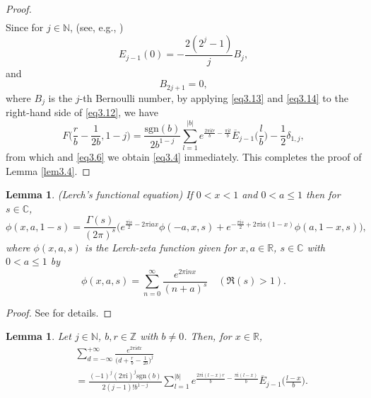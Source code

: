\documentclass[reqno]{amsart}
\numberwithin{equation}{section}
\newtheorem{lemma}[thm]{Lemma}
\begin{document}
\begin{proof}
\begin{eqnarray}
\end{eqnarray}
Since for $j\in\mathbb{N}$, (see, e.g., \cite[p. 805]{abramowitz})
\begin{equation}\label{eq3.13}
E_{j-1}(0)=-\frac{2(2^{j}-1)}{j}B_{j},
\end{equation}
and
\begin{equation}\label{eq3.14}
B_{2j+1}=0,
\end{equation}
where $B_{j}$ is the $j$-th Bernoulli number, by applying \eqref{eq3.13} and \eqref{eq3.14} to the right-hand side of \eqref{eq3.12}, we have
\begin{equation*}
F\biggl(\frac{r}{b}-\frac{1}{2b},1-j\biggl)=\frac{\mathrm{sgn}(b)}{2b^{1-j}}\sum_{l=1}^{|b|}e^{\frac{2\pi \mathrm{i}lr}{b}-\frac{\pi\mathrm{i}l}{b}}\overline{E}_{j-1}\biggl(\frac{l}{b}\biggl)-\frac{1}{2}\delta_{1,j},
\end{equation*}
from which and \eqref{eq3.6} we obtain \eqref{eq3.4} immediately.
This completes the proof of Lemma \ref{lem3.4}.
\end{proof}

\begin{lemma}\label{lem3.5}(Lerch's functional equation) If $0<x<1$ and $0<a\leq1$ then for $s\in\mathbb{C}$,
\begin{equation}\label{eq3.15}
\phi(x,a,1-s)=\frac{\Gamma(s)}{(2\pi)^{s}}\bigl(e^{\frac{\pi \mathrm{i}s}{2}-2\pi\mathrm{i}ax}\phi(-a,x,s)+e^{-\frac{\pi \mathrm{i}s}{2}+2\pi\mathrm{i}a(1-x)}\phi(a,1-x,s)\bigl),
\end{equation}
where $\phi(x,a,s)$ is the Lerch-zeta function given for $x,a\in\mathbb{R}$, $s\in\mathbb{C}$ with $0<a\leq1$ by
\begin{equation*}
\phi(x,a,s)=\sum_{n=0}^{\infty}\frac{e^{2\pi \mathrm{i}nx}}{(n+a)^{s}}\quad(\Re(s)>1).
\end{equation*}
\end{lemma}

\begin{proof}
See \cite{berndt1,lerch} for details.
\end{proof}

\begin{lemma}\label{lem3.6} Let $j\in\mathbb{N}$, $b,r\in\mathbb{Z}$ with $b\not=0$. Then, for $x\in\mathbb{R}$,
\begin{eqnarray}\label{eq3.16}
&&\sum_{d=-\infty}^{+\infty}\frac{e^{2\pi \mathrm{i}dx}}{\bigl(d+\frac{r}{b}-\frac{1}{2b}\bigl)^{j}}\nonumber\\
&&=\frac{(-1)^{j}(2\pi\mathrm{i})^{j}\mathrm{sgn}(b)}{2(j-1)!b^{1-j}}\sum_{l=1}^{|b|}e^{\frac{2\pi \mathrm{i}(l-x)r}{b}-\frac{\pi \mathrm{i}(l-x)}{b}}\overline{E}_{j-1}\biggl(\frac{l-x}{b}\biggl).
\end{eqnarray}
\end{lemma}
\end{document}
